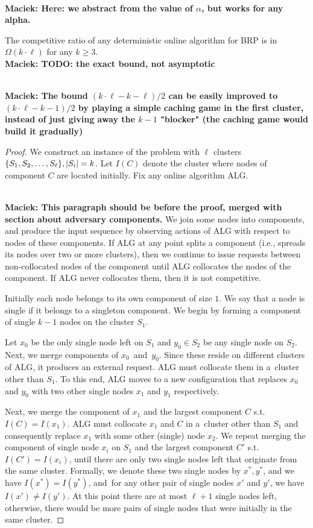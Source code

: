 \documentclass[manuscript,screen=true, review, anonymous]{acmart}
\newcommand{\ALG}{\textsf{ALG}\xspace}
\newcommand{\OBRP}{BRP}
\newcommand{\PPOBRP}{PP-BRP}
\DeclarePairedDelimiter\set{\{}{\}}
\newcommand\maciek[1]{\color{brown}\textbf{\\ Maciek: #1}\color{black}}
\begin{document}
\maciek{Here: we abstract from the value of $\alpha$, but works for any alpha.}

\begin{theorem}
  The competitive ratio of any deterministic online algorithm for \OBRP{} is in $\Omega(k\cdot \ell)$ for any $k\geq 3$.
  \maciek{TODO: the exact bound, not asymptotic}

  \maciek{The bound $(k \cdot \ell - k - \ell) / 2$ can be easily improved to $(k \cdot \ell - k - 1) / 2$ by playing a simple caching game in the first cluster, instead of just giving away the $k-1$ "blocker" (the caching game would build it gradually)}
\end{theorem}

\begin{proof}
	We construct an instance of the problem with $\ell$ clusters 
	$\set{ S_1, S_2,\dots , S_{\ell}}, |S_i|  = k$.
	Let $I(C)$ denote the cluster where nodes of component $C$ are located initially.
  Fix any online algorithm \ALG{}.
  
  \maciek{This paragraph should be before the proof, merged with section about adversary components.}
  We join some nodes into components, and produce the input sequence by observing actions of \ALG{} with respect to nodes of these components.
	If \ALG{} at any point splits a component
	(i.e., spreads its nodes over two or more clusters),
	then we continue to issue requests between non-collocated nodes of the component until \ALG{} collocates the nodes of the component.
	If \ALG{} never collocates them, then it is not competitive.

  Initially each node belongs to its own component of size $1$.
  We say that a node is single if it belongs to a singleton component.
  We begin by forming a component of single $k-1$ nodes on the cluster $S_1$.
  
	Let $x_0$  be the only single node left on $S_1$ and  $y_0 \in S_2$ be any single node on $S_2$.
	Next,
	we merge components of $x_0$~and~$y_0$.
  Since these reside on different clusters of \ALG{}, it produces an external request.
  \ALG{} must collocate them in a~cluster other than $S_1$.
	To this end,
	\ALG{} moves to a new configuration
	that replaces $x_0$ and $y_0$ with two other single nodes $x_1$ and $y_1$ respectively.
	
	Next,
	we merge the component of $x_1$ and the largest component $C$ s.t.~$I(C) = I(x_1)$.
	\ALG{} must collocate $x_1$ and $C$ in a~cluster other than $S_1$ and
	consequently replace $x_1$ with some other (single) node $x_2$.
	We repeat merging the component of single node $x_i$ on $S_1$ and the largest component $C'$ s.t.~$I(C')=I(x_i)$,
  until there are only two single nodes left that  originate from the same cluster.
	Formally, we denote these two single nodes by $x^*, y^*$, and we have $I(x^*) = I(y^*)$, and~for any other pair of single nodes
	$x'$ and $y'$,
	we have $I(x') \neq I(y')$.
	At this point there are at most $\ell+1$ single nodes left,
	otherwise, there would be more pairs of single nodes that were initially in the same cluster.
	

\end{proof}
\end{document}
